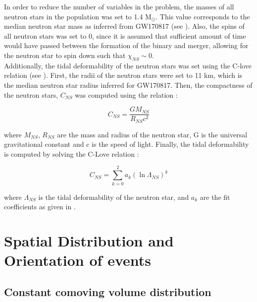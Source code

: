     In order to reduce the number of variables in the problem, the masses of all neutron
    stars in the population was set to 1.4 M$_\odot$. This value corresponds to the
    median neutron star mass as inferred from GW170817 (see \cite{abbott_2018}). Also,
    the spins of all neutron stars was set to 0, since it is assumed that sufficient
    amount of time would have passed between the formation of the binary and merger,
    allowing for the neutron star to spin down such that $\chi_{NS} \sim 0$.\\
    Additionally, the tidal deformability of the neutron stars was set using the C-love
    relation (see \cite{yagi_2017}). First, the radii of the neutron stars were set to
    11 km, which is the median neutron star radius inferred for GW170817. Then, the
    compactness of the neutron stars, $C_{NS}$ was computed using the relation :

    \begin{equation}
        C_{NS} = \dfrac{G M_{NS}}{R_{NS} c^2}
    \end{equation}

    where $M_{NS}$, $R_{NS}$ are the mass and radius of the neutron star, G is the
    universal gravitational constant and c is the speed of light.  Finally, the tidal
    deformability is computed by solving the C-Love relation :

    \begin{equation}
        C_{NS} = \sum_{k=0}^{2} a_k (\ln \Lambda_{NS})^k
    \end{equation}

    where $\Lambda_{NS}$ is the tidal deformability of the neutron star, and $a_k$ are
    the fit coefficients as given in \cite{yagi_2017}.

\section{Spatial Distribution and Orientation of events}\label{sec:space_dist}

    \subsection{Constant comoving volume distribution}

